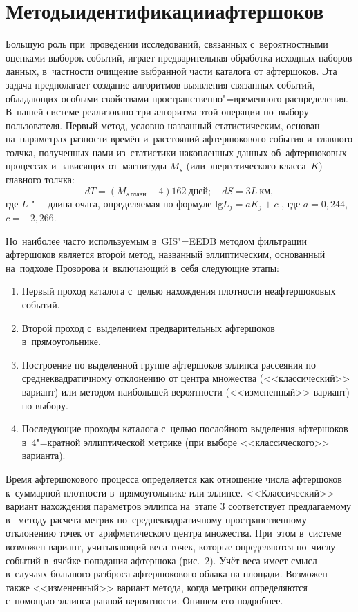 \documentclass[twoside]{article}
\begin{document}
\section{Методы\;идентификации\;афтершоков}
Большую роль при~проведении исследований, связанных с~вероятностными оценками выборок
событий, играет предварительная обработка исход\-ных наборов данных, в~частности
очищение выбранной части каталога от афтершоков.
Эта задача предполагает создание
алгоритмов выявле\-ния связанных событий, обладающих особыми свойствами пространственно"=временного
распределения.
В~нашей системе реализовано три алгоритма этой операции по~выбору пользователя.
Первый метод, условно названный статистическим, основан на~параметрах
разности времён и~расстояний афтершокового события и~главного толчка, полученных \mbox{нами}
из~статистики накопленных данных об~афтершоковых процессах и~зависящих от~магнитуды
$M_s$ (или энергетического класса~$K$) главного толчка:
%
$$dT=(M_{s\, \text{главн}}-4)162\ \mbox{дней};\quad dS=3L\ \mbox{км},
$$
где $L$ "--- длина очага, определяемая по формуле $\mathrm{lg}L_j=aK_j+c$ \cite{author85}, где $a=0{,}244$,\: $c=-2{,}266$.

Но~наиболее часто используемым в~GIS"=EEDB методом фильтрации афтершоков является
второй метод, названный эллиптическим, основанный на~подходе Прозорова \cite{author86} и~включающий
в~себя следующие этапы:
\begin{enumerate}
\item %
Первый проход каталога с~целью нахождения плотности неафтершоковых событий.
\item %
Второй проход с~выделением предварительных афтершоков в~прямоугольнике.
\item %
Построение по выделенной группе афтершоков эллипса рассеяния по \mbox{среднеквадратичному}
отклонению от центра множества (<<классический>> вариант) или методом наибольшей
вероятности (<<измененный>> вариант) по выбору.
\item %
Последующие проходы каталога с~целью послойного выделения афтершоков в~4"=кратной
эллиптической метрике (при выборе <<классического>> варианта).
\end{enumerate}

Время афтершокового процесса определяется как отношение числа афтершоков
к~суммарной плотности в~прямоугольнике или эллипсе. <<Класси\-ческий>> вариант нахождения
параметров эллипса на~этапе 3 соответствует предлагаемому в~\cite{author86} методу расчета метрик
по~среднеквадратичному пространственному откло\-нению точек от~арифметического центра
множества.
При~этом в~системе возможен вариант, учитывающий веса точек, которые
определяются по~числу событий в~ячейке попадания афтершока (рис.~2).
Учёт веса
имеет смысл в~случаях большого разброса афтершокового облака на площади.
Возможен
также <<измененный>> вариант метода, когда метрики определяются с~помощью эллипса
равной вероятности.
Опишем его подробнее.
\end{document}
